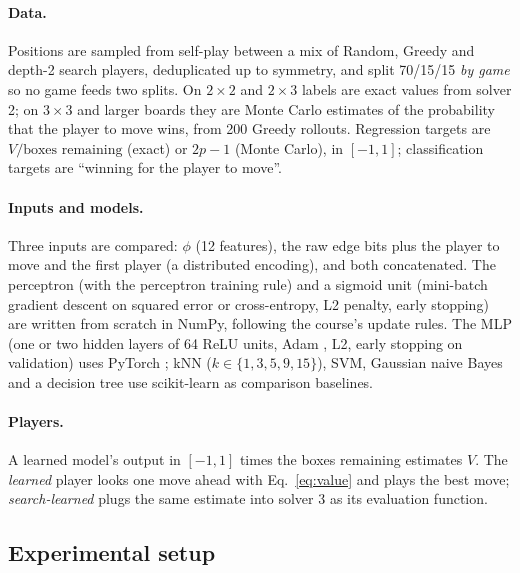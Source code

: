 \documentclass[11pt,a4paper]{article}
\newcommand{\bd}[2]{$#1{\times}#2$}            %
\begin{document}
\paragraph{Data.} Positions are sampled from self-play between a mix of Random, Greedy
and depth-2 search players, deduplicated up to symmetry, and split 70/15/15 \emph{by
game} so no game feeds two splits. On \bd{2}{2} and \bd{2}{3} labels are exact values
from solver 2; on \bd{3}{3} and larger boards they are Monte Carlo estimates of the
probability that the player to move wins, from 200 Greedy rollouts. Regression targets
are $V/\text{boxes remaining}$ (exact) or $2p-1$ (Monte Carlo), in $[-1,1]$;
classification targets are ``winning for the player to move''.

\paragraph{Inputs and models.} Three inputs are compared: $\phi$ (12 features), the raw
edge bits plus the player to move and the first player (a distributed encoding), and
both concatenated. The perceptron (with the perceptron training rule) and a sigmoid unit
(mini-batch gradient descent on squared error or cross-entropy, L2 penalty, early
stopping) are written from scratch in NumPy, following the course's update rules. The
MLP (one or two hidden layers of 64 ReLU units, Adam \cite{kingma2015adam}, L2, early
stopping on validation) uses PyTorch \cite{paszke2019pytorch}; kNN ($k\in\{1,3,5,9,15\}$),
SVM, Gaussian naive Bayes and a decision tree use scikit-learn \cite{pedregosa2011sklearn}
as comparison baselines.

\paragraph{Players.} A learned model's output in $[-1,1]$ times the boxes remaining
estimates $V$. The \emph{learned} player looks one move ahead with Eq.~\eqref{eq:value}
and plays the best move; \emph{search-learned} plugs the same estimate into solver 3 as
its evaluation function.

\subsection{Experimental setup}
\end{document}
